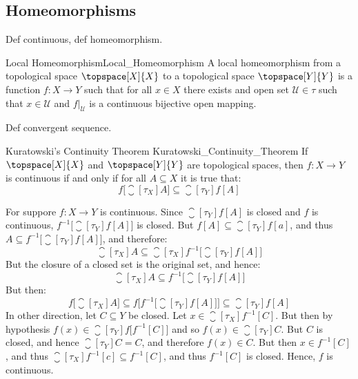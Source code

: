     \subsection{Homeomorphisms}
    Def continuous, def homeomorphism.
    \begin{fdefinition}{Local Homeomorphism}{Local_Homeomorphism}
        A local homeomorphism from a topological space $\topspace[X]{X}$ to
        a topological space $\topspace[Y]{Y}$ is a function
        $f:X\rightarrow{Y}$ such that for all $x\in{X}$ there exists and
        open set $\mathcal{U}\in\tau$ such that $x\in\mathcal{U}$ and
        $f|_{\mathcal{U}}$ is a continuous bijective open mapping.
    \end{fdefinition}
    Def convergent sequence.
    \begin{ftheorem}{Kuratowski's Continuity Theorem}
                    {Kuratowski_Continuity_Theorem}
        If $\topspace[X]{X}$ and $\topspace[Y]{Y}$ are topological spaces,
        then $f:X\rightarrow{Y}$ is continuous if and only if for all
        $A\subseteq{X}$ it is true that:
        \begin{equation*}
            f\big[\closure[\tau_{X}]{A}\big]\subseteq
            \closure[\tau_{Y}]{f[A]}
        \end{equation*}
    \end{ftheorem}
    \begin{bproof}
        For suppore $f:X\rightarrow{Y}$ is continuous. Since
        $\closure[\tau_{Y}]{f[A]}$ is closed and $f$ is continuous,
        $f^{\minus{1}}\big[\closure[\tau_{Y}]{f[A]}\big]$ is closed.
        But $f[A]\subseteq\closure[\tau_{Y}]{f[a]}$, and thus
        $A\subseteq{f}^{\minus{1}}\big[\closure[\tau_{Y}]{f[A]}\big]$,
        and therefore:
        \begin{equation}
            \closure[\tau_{X}]{A}\subseteq
            \closure[\tau_{X}]
                {{f}^{\minus{1}}\big[\closure[\tau_{Y}]{f[A]}\big]}
        \end{equation}
        But the closure of a closed set is the original set, and hence:
        \begin{equation}
            \closure[\tau_{X}]{A}\subseteq
                f^{\minus{1}}\big[\closure[\tau_{Y}]{f[A]}\big]
        \end{equation}
        But then:
        \begin{equation}
            f\big[\closure[\tau_{X}]{A}\big]\subseteq
            f\Big[f^{\minus{1}}\big[\closure[\tau_{Y}]{f[A]}\big]\Big]
            \subseteq\closure[\tau_{Y}]{f[A]}
        \end{equation}
        In other direction, let $C\subseteq{Y}$ be closed. Let
        $x\in\closure[\tau_{X}]{f^{\minus{1}}[C]}$. But then by hypothesis
        $f(x)\in\closure[\tau_{Y}]{f\big[f^{\minus{1}}[C]\big]}$ and so
        $f(x)\in\closure[\tau_{Y}]{C}$. But $C$ is closed, and hence
        $\closure[\tau_{Y}]{C}=C$, and therefore $f(x)\in{C}$. But then
        $x\in{f}^{\minus{1}}[C]$, and thus
        $\closure[\tau_{X}]{f^{\minus{1}}[c]}\subseteq{f}^{\minus{1}}[C]$,
        and thus $f^{\minus{1}}[C]$ is closed. Hence, $f$ is continuous.
    \end{bproof}
